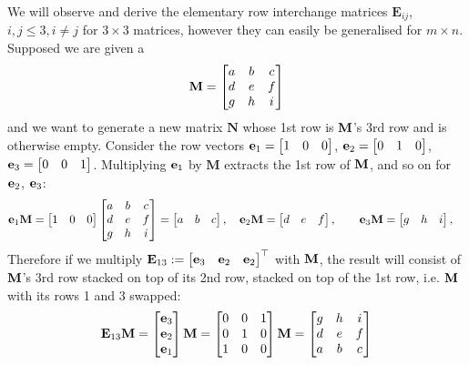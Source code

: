 \documentclass[a4paper]{article}
\begin{document}
We will observe and derive the elementary row interchange matrices $\textbf{E}_{ij}$, $i,j\leq 3, i \neq j$ for $3 \times 3$ matrices, however they can easily be generalised for $m \times n$. Supposed we are given a
\[
\textbf{M} = 
\begin{bmatrix}
a & b & c \\
d & e & f \\
g & h & i
\end{bmatrix}
\]
and we want to generate a new matrix $\textbf{N}$ whose 1st row is $\textbf{M}$'s 3rd row and is otherwise empty. Consider the row vectors $\textbf{e}_1 = \begin{bmatrix}1 & 0 & 0\end{bmatrix}$, $\textbf{e}_2 = \begin{bmatrix}0 & 1 & 0\end{bmatrix}$, $\textbf{e}_3 = \begin{bmatrix}0 & 0 & 1\end{bmatrix}$. Multiplying $\textbf{e}_1$ by $\textbf{M}$ extracts the 1st row of $\textbf{M}$, and so on for $\textbf{e}_2$, $\textbf{e}_3$:
\[
\textbf{e}_1 \textbf{M} = 
\begin{bmatrix}
1 &0 &0
\end{bmatrix}
\begin{bmatrix}
a & b & c \\
d & e & f \\
g & h & i
\end{bmatrix} = 
\begin{bmatrix}
a & b & c
\end{bmatrix},
\quad \textbf{e}_2 \textbf{M} = \begin{bmatrix} d & e & f \end{bmatrix}, \quad
\quad \textbf{e}_3 \textbf{M} = \begin{bmatrix} g & h & i \end{bmatrix}, \quad
\]
Therefore if we multiply $\textbf{E}_{13} := \begin{bmatrix}
\textbf{e}_3 & \textbf{e}_2 & \textbf{e}_2
\end{bmatrix}^{\top}$ with $\textbf{M}$, the result will consist of $\textbf{M}$'s 3rd row  stacked on top of its 2nd row, stacked on top of the 1st row, i.e. $\textbf{M}$ with its rows 1 and 3 swapped:
\[
\textbf{E}_{13}\textbf{M} = 
\begin{bmatrix}
\textbf{e}_3 \\ \textbf{e}_2 \\ \textbf{e}_1
\end{bmatrix} \textbf{M} = 
\begin{bmatrix}
0 & 0 & 1\\
0 & 1 & 0 \\
1 & 0 & 0
\end{bmatrix}\textbf{M} = 
\begin{bmatrix}
g & h & i\\
d & e & f \\
a & b & c 
\end{bmatrix}
\]
\end{document}
